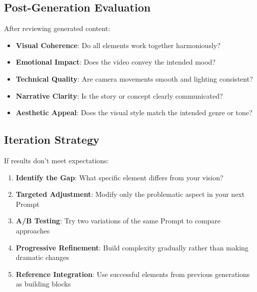 \subsection*{Post-Generation Evaluation}
After reviewing generated content:

\begin{itemize}
\item[$\square$] \textbf{Visual Coherence}: Do all elements work together harmoniously?
\item[$\square$] \textbf{Emotional Impact}: Does the video convey the intended mood?
\item[$\square$] \textbf{Technical Quality}: Are camera movements smooth and lighting consistent?
\item[$\square$] \textbf{Narrative Clarity}: Is the story or concept clearly communicated?
\item[$\square$] \textbf{Aesthetic Appeal}: Does the visual style match the intended genre or tone?
\end{itemize}

\subsection*{Iteration Strategy}
If results don't meet expectations:

\begin{enumerate}
\item \textbf{Identify the Gap}: What specific element differs from your vision?
\item \textbf{Targeted Adjustment}: Modify only the problematic aspect in your next Prompt
\item \textbf{A/B Testing}: Try two variations of the same Prompt to compare approaches
\item \textbf{Progressive Refinement}: Build complexity gradually rather than making dramatic changes
\item \textbf{Reference Integration}: Use successful elements from previous generations as building blocks
\end{enumerate}

